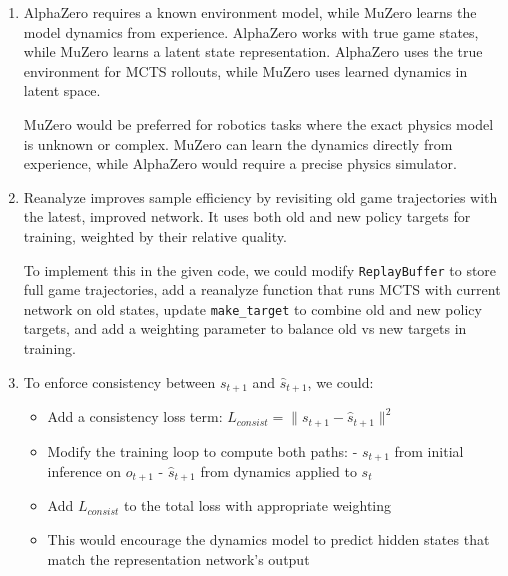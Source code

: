 \documentclass[12pt]{article}
\begin{document}
\begin{tcolorbox}[height=45em, width=\textwidth]
\begin{center}
    \begin{enumerate}
        \item AlphaZero requires a known environment model, while MuZero learns the model dynamics from experience. AlphaZero works with true game states, while MuZero learns a latent state representation. AlphaZero uses the true environment for MCTS rollouts, while MuZero uses learned dynamics in latent space.
        
        MuZero would be preferred for robotics tasks where the exact physics model is unknown or complex. MuZero can learn the dynamics directly from experience, while AlphaZero would require a precise physics simulator.
    
        \item Reanalyze improves sample efficiency by revisiting old game trajectories with the latest, improved network. It uses both old and new policy targets for training, weighted by their relative quality.
        
        To implement this in the given code, we could modify \texttt{ReplayBuffer} to store full game trajectories, add a reanalyze function that runs MCTS with current network on old states, update \texttt{make\_target} to combine old and new policy targets, and add a weighting parameter to balance old vs new targets in training.
    
        \item To enforce consistency between $s_{t+1}$ and $\hat{s}_{t+1}$, we could:
        \begin{itemize}
            \item Add a consistency loss term: $L_{consist} = \|s_{t+1} - \hat{s}_{t+1}\|^2$
            \item Modify the training loop to compute both paths:
                - $s_{t+1}$ from initial inference on $o_{t+1}$
                - $\hat{s}_{t+1}$ from dynamics applied to $s_t$
            \item Add $L_{consist}$ to the total loss with appropriate weighting
            \item This would encourage the dynamics model to predict hidden states that match the representation network's output
        \end{itemize}
    \end{enumerate}    
\end{center}
\end{tcolorbox}
\end{document}
